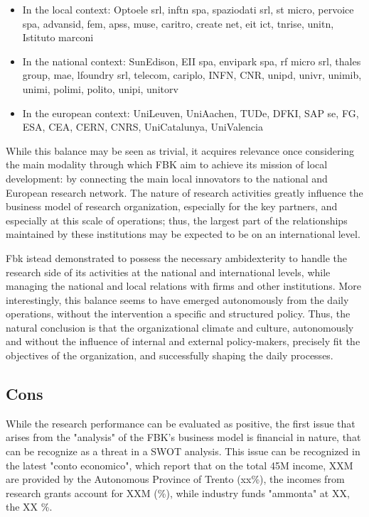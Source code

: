 \begin{itemize}

\item In the local context: Optoele srl, inftn spa, spaziodati srl, st micro, pervoice spa, advansid, fem, apss, muse, caritro, create net, eit ict, tnrise, unitn, Istituto marconi

\item In the national context: SunEdison, EII spa, envipark spa, rf micro srl, thales group, mae, lfoundry srl, telecom, cariplo, INFN, CNR, unipd, univr, unimib, unimi, polimi, polito, unipi, unitorv

\item In the european context: UniLeuven, UniAachen, TUDe, DFKI, SAP se, FG, ESA, CEA, CERN, CNRS, UniCatalunya, UniValencia

\end{itemize}

While this balance may be seen as trivial, it acquires relevance once considering the main modality through which FBK aim to achieve its mission of local development: by connecting the main local innovators to the national and European research network. The nature of research activities greatly influence the business model of research organization, especially for the key partners, and especially at this scale of operations; thus, the largest part of the relationships maintained by these institutions may be expected to be on an international level. 

Fbk istead demonstrated to possess the necessary ambidexterity to handle the research side of its activities at the national and international levels, while managing the national and local relations with firms and other institutions. More interestingly, this balance seems to have emerged autonomously from the daily operations, without the intervention a specific and structured policy. Thus, the natural conclusion is that the organizational climate and culture, autonomously and without the influence of internal and external policy-makers, precisely fit the objectives of the organization, and successfully shaping the daily processes.  

\subsection{Cons}

While the research performance can be evaluated as positive, the first issue that arises from the "analysis" of the FBK's business model is financial in nature, that can be recognize as a threat in a SWOT analysis. This issue can be recognized in the latest "conto economico", which report that on the total 45M income, XXM are provided by the Autonomous Province of Trento (xx\%), the incomes from research grants account for XXM (\%), while industry funds "ammonta" at XX, the XX \%.

